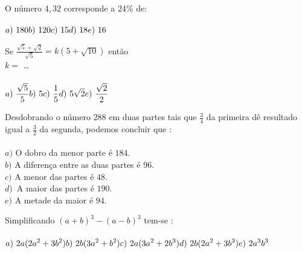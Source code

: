 \hline
\vfill

\begin{quest}
	O n\'umero $4,32$ corresponde a $24\%$ de: \\ \\
	\(\displaystyle a)\ 180 \hfill b)\ 120 \hfill c)\ 15 \hfill d)\ 18 \hfill e)\ 16\)
\end{quest}

\newpage

\begin{quest}
	Se \(\displaystyle \frac{\sqrt{5} + \sqrt{2}}{\sqrt{5}} = k(5+\sqrt{10}) \) ent\~ao \\ $k =$ \dots \\ \\
	\(\displaystyle a)\ \frac{\sqrt{5}}{5} \hfill b)\ 5 \hfill c)\ \frac{1}{5} \hfill d)\ 5\sqrt{2} \hfill e)\ \frac{\sqrt{2}}{2}\)
\end{quest}

\hline
\vfill

\begin{quest}
	Desdobrando o n\'umero 288 em duas partes tais que \(\displaystyle \frac{3}{4}\) da primeira d\^e resultado igual a \(\displaystyle \frac{3}{2}\) da segunda, podemos concluir que : \\ \\
	$a)$ O dobro da menor parte \'e $184$. \\ $b)$ A diferen\c{c}a entre as duas partes \'e $96$. \\ $c)$ A menor das partes \'e $48$. \\ $d)$\ A maior das partes \'e $190$. \\ $e)$ A metade da maior \'e $94$.
\end{quest}

\hline
\vfill

\begin{quest}
	Simplificando \(\displaystyle (a+b)^3-(a-b)^3\) tem-se : \\ \\
	\(\displaystyle a)\ 2a(2a^2 + 3b^2) \hfill b)\ 2b(3a^2 + b^2) \\ \\ \hfill c)\ 2a(3a^2 + 2b^3) \hfill  d)\ 2b(2a^2 + 3b^3) \hfill \\ \\ e)\ 2a^3b^3 \)
\end{quest}

